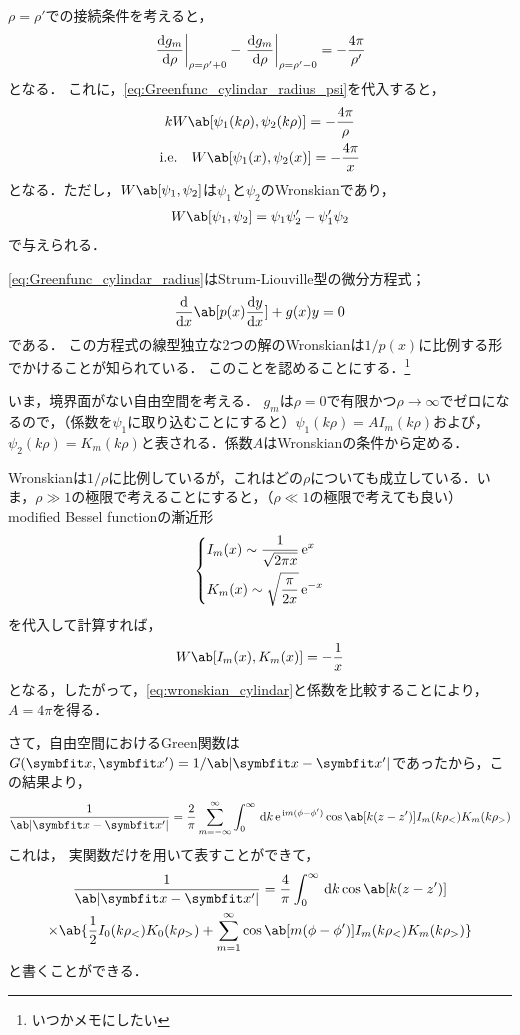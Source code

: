 $\rho = \rho'$での接続条件を考えると，
\begin{gather}  
  \eval{\diff{g_m}{\rho}}_{\rho = \rho' +0} - \eval{\diff{g_m}{\rho}}_{\rho = \rho' - 0} = - \frac{4\pi}{\rho'}
\end{gather}
となる．
これに，\eqref{eq:Greenfunc_cylindar_radius_psi}を代入すると，
\begin{gather}
  k W\ab[\psi_1(k\rho), \psi_2(k\rho)] = -\frac{4\pi}{\rho} \\
  \label{eq:wronskian_cylindar}
  \text{i.e.}\qq W\ab[\psi_1(x), \psi_2(x)] = -\frac{4\pi}{x}
\end{gather}
となる．ただし，$W\ab[\psi_1, \psi_2]$は$\psi_1$と$\psi_2$のWronskianであり，
\begin{gather}
  W\ab[\psi_1, \psi_2] = \psi_1 \psi_2' - \psi_1'\psi_2
\end{gather}
で与えられる．

\eqref{eq:Greenfunc_cylindar_radius}はStrum-Liouville型の微分方程式；
\begin{gather}
  \diff**{x}{\ab[p(x) \diff{y}{x}]} + g(x) y = 0
\end{gather}
である．
この方程式の線型独立な2つの解のWronskianは$1/p(x)$に比例する形でかけることが知られている．
このことを認めることにする．\footnote{いつかメモにしたい}

いま，境界面がない自由空間を考える．
$g_m$は$\rho = 0$で有限かつ$\rho \to \infty$でゼロになるので，（係数を$\psi_1$に取り込むことにすると）$\psi_1(k\rho) = AI_m(k\rho)$および，$\psi_2(k\rho) = K_m(k\rho)$と表される．係数$A$はWronskianの条件から定める．

Wronskianは$1/\rho$に比例しているが，これはどの$\rho$についても成立している．いま，$\rho \gg 1$の極限で考えることにすると，（$\rho \ll 1$の極限で考えても良い）
modified Bessel functionの漸近形
\begin{gather}  
  \begin{dcases}
    I_m(x) \sim \frac{1}{\sqrt{2\pi x}}\,\mathrm{e}^x\\
    K_m(x) \sim \sqrt{\frac{\pi}{2x}}\,\mathrm{e}^{-x}
  \end{dcases}
\end{gather}
を代入して計算すれば，
\begin{gather}
  W \ab[I_m(x), K_m(x)] = -\frac{1}{x}
\end{gather}
となる，したがって，\eqref{eq:wronskian_cylindar}と係数を比較することにより，$A = 4\pi$を得る．

さて，自由空間におけるGreen関数は$G(\bs{x}, \bs{x}') = 1 / \ab|\bs{x} - \bs{x}'|$であったから，この結果より，
\begin{gather}
  \frac{1}{\ab|\bs{x} - \bs{x}'|} = \frac{2}{\pi} \sum_{m=-\infty}^{\infty} \int_0^\infty \dl{k} \e^{\i m(\phi - \phi')} \cos\ab[k(z - z')] I_m(k\rho_<) K_m(k\rho_>)
\end{gather}
これは，
実関数だけを用いて表すことができて，
\begin{multline}
  \frac{1}{\ab|\bs{x} - \bs{x}'|} = \frac{4}{\pi} \int_0^\infty \dl{k} \cos\ab[k(z - z')] \\
  \times \ab\{\frac{1}{2}I_0(k\rho_<)K_0(k\rho_>) + \sum_{m=1}^\infty \cos\ab[m(\phi - \phi')] I_m(k\rho_<) K_m(k\rho_>)\}
\end{multline}
と書くことができる．

